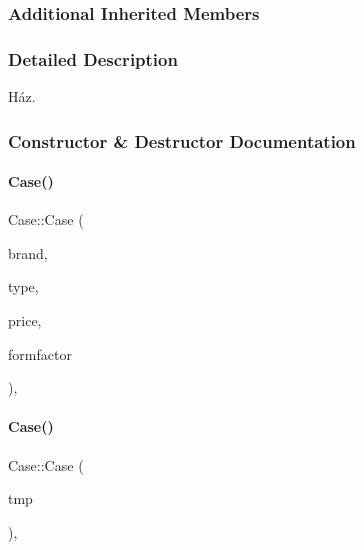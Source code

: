\subsubsection*{Additional Inherited Members}


\subsubsection{Detailed Description}
Ház. 

\subsubsection{Constructor \& Destructor Documentation}
\mbox{\label{class_case_a0d953adffc664636549235d729f13260}} 
\paragraph{\texorpdfstring{Case()}{Case()}\hspace{0.1cm}{\footnotesize\ttfamily [1/2]}}
{\footnotesize\ttfamily Case\+::\+Case (\begin{DoxyParamCaption}\item[{\mbox{\hyperlink{class_string}{String}}}]{brand,  }\item[{\mbox{\hyperlink{class_string}{String}}}]{type,  }\item[{int}]{price,  }\item[{\mbox{\hyperlink{class_string}{String}}}]{formfactor }\end{DoxyParamCaption})\hspace{0.3cm}{\ttfamily [inline]}, {\ttfamily [explicit]}}

\mbox{\label{class_case_a035b7e07200ba4cf72c86a992d95b517}} 
\paragraph{\texorpdfstring{Case()}{Case()}\hspace{0.1cm}{\footnotesize\ttfamily [2/2]}}
{\footnotesize\ttfamily Case\+::\+Case (\begin{DoxyParamCaption}\item[{\mbox{\hyperlink{struct_temp_input}{Temp\+Input}} \&}]{tmp }\end{DoxyParamCaption})\hspace{0.3cm}{\ttfamily [inline]}, {\ttfamily [explicit]}}



